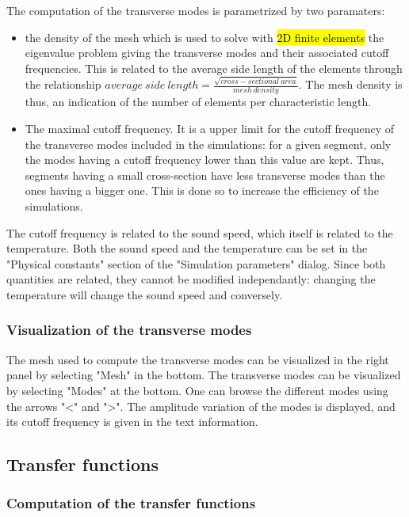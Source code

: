 \documentclass[]{article}
\begin{document}
	The computation of the transverse modes is parametrized by two 
	paramaters: 
	\begin{itemize}
		\item the density of the mesh which is used to solve with 
		\hl{2D finite elements} the 
		eigenvalue problem giving the transverse modes and their 
		associated cutoff frequencies. This is related to the average
		side length of the elements through the relationship
		$average~side~length = \frac{\sqrt{cross-sectional~area}}{mesh~density}$. 
		The mesh density is thus, an indication of the number of
		elements per characteristic length.
		\item The maximal cutoff frequency. It is a upper limit for the 
		cutoff frequency of the transverse modes included in the 
		simulations: for a given segment, only the modes having a cutoff
		frequency lower than this value are kept. Thus, segments having 
		a small cross-section have less transverse modes than the ones
		having a bigger one. This is done so to increase the efficiency 
		of the simulations.
	\end{itemize}

	The cutoff frequency is related to the sound speed, which itself 
	is related to the temperature. Both the sound speed and the 
	temperature can be set in the "Physical constants" section of 
	the "Simulation parameters" dialog. Since both quantities are
	related, they cannot be modified independantly: changing the 
	temperature will change the sound speed and conversely.

	\subsubsection{Visualization of the transverse modes}
	
	The mesh used to compute the transverse modes can be visualized
	in the right panel by selecting "Mesh" in the bottom.
	The transverse modes can be visualized by 
	selecting "Modes" at the bottom. 
	One can browse the different modes using the arrows "<" and ">".
	The amplitude variation of the modes is displayed, and its cutoff 
	frequency is given in the text information.
	
	\subsection{Transfer functions}
	
	\subsubsection{Computation of the transfer functions}
	
\end{document}
